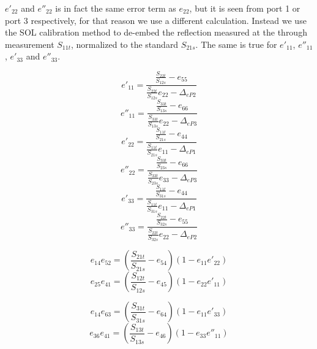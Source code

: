$e'_{22}$ and $e''_{22}$ is in fact the same error term as $e_{22}$, but it is seen from port 1 or port 3 respectively, for that reason we use a different calculation. Instead we use the SOL calibration method to de-embed the reflection measured at the through measurement $S_{11t}$, normalized to the standard $S_{21s}$. The same is true for $e'_{11}$, $e''_{11}$, $e'_{33}$ and $e''_{33}$. 

\begin{equation}
\label{eqn:e'11_3p}
e'_{11} = \frac{\frac{S_{22t}}{S_{12s}}-e_{55}}{\frac{S_{22t}}{S_{12s}}e_{22}-\Delta_{eP2}}
\end{equation}
\begin{equation}
\label{eqn:e''11_3p}
e''_{11} = \frac{\frac{S_{33t}}{S_{13s}}-e_{66}}{\frac{S_{33t}}{S_{13s}}e_{22}-\Delta_{eP3}}
\end{equation}
\begin{equation}
\label{eqn:e'22_3p}
e'_{22} = \frac{\frac{S_{11t}}{S_{21s}}-e_{44}}{\frac{S_{11t}}{S_{21s}}e_{11}-\Delta_{eP1}}
\end{equation}
\begin{equation}
\label{eqn:e''22_3p}
e''_{22} = \frac{\frac{S_{33t}}{S_{23s}}-e_{66}}{\frac{S_{33t}}{S_{23s}}e_{33}-\Delta_{eP3}}
\end{equation}
\begin{equation}
\label{eqn:e'33_3p}
e'_{33} = \frac{\frac{S_{11t}}{S_{31s}}-e_{44}}{\frac{S_{11t}}{S_{31s}}e_{11}-\Delta_{eP1}}
\end{equation}
\begin{equation}
\label{eqn:e''33_3p}
e''_{33} = \frac{\frac{S_{22t}}{S_{32s}}-e_{55}}{\frac{S_{22t}}{S_{32s}}e_{22}-\Delta_{eP2}}
\end{equation}

\begin{equation}
\label{eqn:e14e52_3p}
e_{14}e_{52} = \left(\frac{S_{21t}}{S_{21s}} - e_{54}\right)\left(1-e_{11}e'_{22}\right)
\end{equation}
\begin{equation}
\label{eqn:e25e41_3p}
e_{25}e_{41} = \left(\frac{S_{12t}}{S_{12s}} - e_{45}\right)\left(1-e_{22}e'_{11}\right)
\end{equation}

\begin{equation}
\label{eqn:e14e63_3p}
e_{14}e_{63} = \left(\frac{S_{31t}}{S_{31s}} - e_{64}\right)\left(1-e_{11}e'_{33}\right)
\end{equation}
\begin{equation}
\label{eqn:e36e41_3p}
e_{36}e_{41} = \left(\frac{S_{13t}}{S_{13s}} - e_{46}\right)\left(1-e_{33}e''_{11}\right)
\end{equation}

